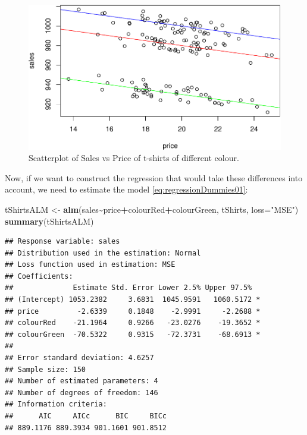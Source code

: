 \documentclass[
]{book}
\newenvironment{Shaded}{\begin{snugshade}}{\end{snugshade}}
\newcommand{\DataTypeTok}[1]{\textcolor[rgb]{0.13,0.29,0.53}{#1}}
\newcommand{\KeywordTok}[1]{\textcolor[rgb]{0.13,0.29,0.53}{\textbf{#1}}}
\newcommand{\NormalTok}[1]{#1}
\newcommand{\OperatorTok}[1]{\textcolor[rgb]{0.81,0.36,0.00}{\textbf{#1}}}
\newcommand{\StringTok}[1]{\textcolor[rgb]{0.31,0.60,0.02}{#1}}
\theoremstyle{definition}
\theoremstyle{definition}
\theoremstyle{definition}
\theoremstyle{definition}
\theoremstyle{remark}
\begin{document}
\begin{figure}
\centering
\includegraphics{Svetunkov---Statistics-for-Business-Analytics_files/figure-latex/tShirtsScatterPlot-1.pdf}
\caption{\label{fig:tShirtsScatterPlot}Scatterplot of Sales vs Price of t-shirts of different colour.}
\end{figure}

Now, if we want to construct the regression that would take these differences into account, we need to estimate the model \eqref{eq:regressionDummies01}:

\begin{Shaded}
\begin{Highlighting}[]
\NormalTok{tShirtsALM \textless{}{-}}\StringTok{ }\KeywordTok{alm}\NormalTok{(sales}\OperatorTok{\textasciitilde{}}\NormalTok{price}\OperatorTok{+}\NormalTok{colourRed}\OperatorTok{+}\NormalTok{colourGreen, tShirts, }\DataTypeTok{loss=}\StringTok{"MSE"}\NormalTok{)}
\KeywordTok{summary}\NormalTok{(tShirtsALM)}
\end{Highlighting}
\end{Shaded}

\begin{verbatim}
## Response variable: sales
## Distribution used in the estimation: Normal
## Loss function used in estimation: MSE
## Coefficients:
##              Estimate Std. Error Lower 2.5% Upper 97.5%  
## (Intercept) 1053.2382     3.6831  1045.9591   1060.5172 *
## price         -2.6339     0.1848    -2.9991     -2.2688 *
## colourRed    -21.1964     0.9266   -23.0276    -19.3652 *
## colourGreen  -70.5322     0.9315   -72.3731    -68.6913 *
## 
## Error standard deviation: 4.6257
## Sample size: 150
## Number of estimated parameters: 4
## Number of degrees of freedom: 146
## Information criteria:
##      AIC     AICc      BIC     BICc 
## 889.1176 889.3934 901.1601 901.8512
\end{verbatim}
\end{document}
